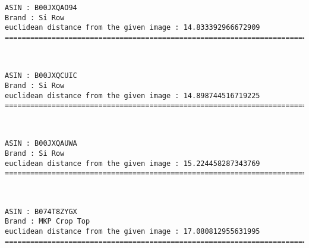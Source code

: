 \documentclass[11pt]{article}
\begin{document}
    \begin{Verbatim}[commandchars=\\\{\}]
ASIN : B00JXQAO94
Brand : Si Row
euclidean distance from the given image : 14.833392966672909
=============================================================================================================================

    \end{Verbatim}

    \begin{center}
    \end{center}
    { \hspace*{\fill} \\}
    
    \begin{Verbatim}[commandchars=\\\{\}]
ASIN : B00JXQCUIC
Brand : Si Row
euclidean distance from the given image : 14.898744516719225
=============================================================================================================================

    \end{Verbatim}

    \begin{center}
    \end{center}
    { \hspace*{\fill} \\}
    
    \begin{Verbatim}[commandchars=\\\{\}]
ASIN : B00JXQAUWA
Brand : Si Row
euclidean distance from the given image : 15.224458287343769
=============================================================================================================================

    \end{Verbatim}

    \begin{center}
    \end{center}
    { \hspace*{\fill} \\}
    
    \begin{Verbatim}[commandchars=\\\{\}]
ASIN : B074T8ZYGX
Brand : MKP Crop Top
euclidean distance from the given image : 17.080812955631995
=============================================================================================================================

    \end{Verbatim}
\end{document}
